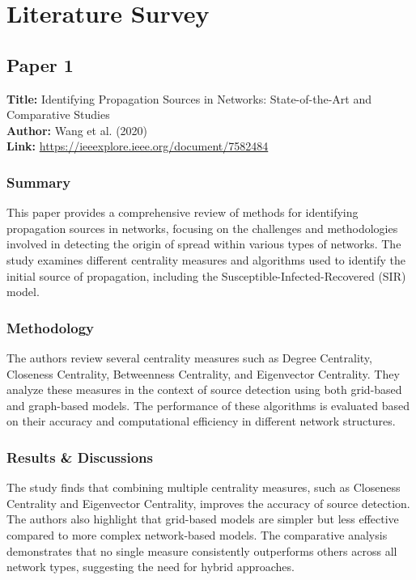 \chapter{Literature Survey}

\section{Paper 1}
\textbf{Title:} Identifying Propagation Sources in Networks: State-of-the-Art and Comparative Studies \\
\textbf{Author:} Wang et al. (2020) \\
\textbf{Link:} \url{https://ieeexplore.ieee.org/document/7582484}

\subsection{Summary}

This paper provides a comprehensive review of methods for identifying propagation sources in networks, focusing on the challenges and methodologies involved in detecting the origin of spread within various types of networks. The study examines different centrality measures and algorithms used to identify the initial source of propagation, including the Susceptible-Infected-Recovered (SIR) model.

\subsection{Methodology}

The authors review several centrality measures such as Degree Centrality, Closeness Centrality, Betweenness Centrality, and Eigenvector Centrality. They analyze these measures in the context of source detection using both grid-based and graph-based models. The performance of these algorithms is evaluated based on their accuracy and computational efficiency in different network structures.

\subsection{Results \& Discussions}

The study finds that combining multiple centrality measures, such as Closeness Centrality and Eigenvector Centrality, improves the accuracy of source detection. The authors also highlight that grid-based models are simpler but less effective compared to more complex network-based models. The comparative analysis demonstrates that no single measure consistently outperforms others across all network types, suggesting the need for hybrid approaches.

